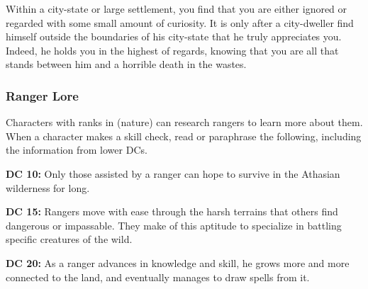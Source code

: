 Within a city-state or large settlement, you find that you are either ignored or regarded with some small amount of curiosity. It is only after a city-dweller find himself outside the boundaries of his city-state that he truly appreciates you. Indeed, he holds you in the highest of regards, knowing that you are all that stands between him and a horrible death in the wastes.

\subsubsection{Ranger Lore}

Characters with ranks in  (nature) can research rangers to learn more about them. When a character makes a skill check, read or paraphrase the following, including the information from lower DCs.

\textbf{DC 10:} Only those assisted by a ranger can hope to survive in the Athasian wilderness for long.

\textbf{DC 15:} Rangers move with ease through the harsh terrains that others find dangerous or impassable. They make of this aptitude to specialize in battling specific creatures of the wild.

\textbf{DC 20:} As a ranger advances in knowledge and skill, he grows more and more connected to the land, and eventually manages to draw spells from it.
